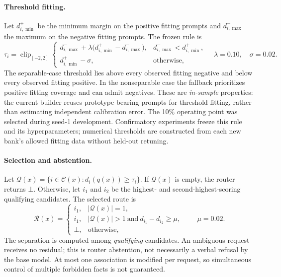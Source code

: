 \documentclass{article}
\newcommand{\router}{\mathcal{R}}
\DeclareMathOperator{\clip}{clip}
\begin{document}
\paragraph{Threshold fitting.}
Let $d^+_{i,\min}$ be the minimum margin on the positive fitting prompts and
$d^-_{i,\max}$ the maximum on the negative fitting prompts. The frozen rule is
\begin{equation}
 \tau_i=\clip_{[-2,2]}\begin{cases}
 d^-_{i,\max}+\lambda\bigl(d^+_{i,\min}-d^-_{i,\max}\bigr),
       &d^-_{i,\max}<d^+_{i,\min},\\
 d^+_{i,\min}-\sigma,&\text{otherwise},
 \end{cases}
 \quad \lambda=0.10,\quad\sigma=0.02.
 \label{eq:threshold}
\end{equation}
The separable-case threshold lies above every observed fitting negative and
below every observed fitting positive. In the nonseparable case the fallback
prioritizes positive fitting coverage and can admit negatives. These are
\emph{in-sample} properties: the current builder reuses prototype-bearing
prompts for threshold fitting, rather than estimating independent calibration
error. The 10\% operating point was selected during seed-1 development.
Confirmatory experiments freeze this rule and its hyperparameters; numerical
thresholds are constructed from each new bank's allowed fitting data without
held-out retuning.

\paragraph{Selection and abstention.}
Let $\mathcal{Q}(x)=\{i\in\mathcal{C}(x):d_i(q(x))\geq\tau_i\}$.
If $\mathcal{Q}(x)$ is empty, the router returns $\bot$. Otherwise, let $i_1$
and $i_2$ be the highest- and second-highest-scoring qualifying candidates.
The selected route is
\begin{equation}
 \router(x)=
 \begin{cases}
 i_1,&|\mathcal{Q}(x)|=1,\\
 i_1,&|\mathcal{Q}(x)|>1\ \text{and}\ d_{i_1}-d_{i_2}\geq\mu,\\
 \bot,&\text{otherwise},
 \end{cases}
 \qquad\mu=0.02.
 \label{eq:selection}
\end{equation}
The separation is computed among \emph{qualifying} candidates. An ambiguous
request receives no residual; this is router abstention, not necessarily a
verbal refusal by the base model. At most one association is modified per
request, so simultaneous control of multiple forbidden facts is not guaranteed.
\end{document}
